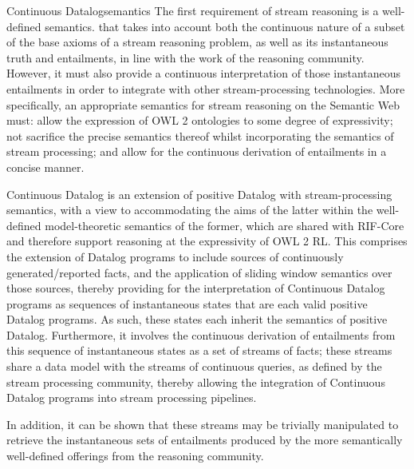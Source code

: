 \begin{nestedsection}{Continuous Datalog}{semantics}
The first requirement of stream reasoning is a well-defined semantics.
that takes into account both the continuous nature of a subset of the
base axioms of a stream reasoning problem, as well as its
instantaneous truth and entailments, in line with the work of the
reasoning community.  However, it must also provide a continuous
interpretation of those instantaneous entailments in order to
integrate with other stream-processing technologies.  More
specifically, an appropriate semantics for stream reasoning on the
Semantic Web must: allow the expression of OWL 2 ontologies to some
degree of expressivity; not sacrifice the precise semantics thereof
whilst incorporating the semantics of stream processing; and allow for
the continuous derivation of entailments in a concise manner.

Continuous Datalog is an extension of positive Datalog with
stream-processing semantics, with a view to accommodating the aims of
the latter within the well-defined model-theoretic semantics of the
former, which are shared with RIF-Core \cite{w3crifbld} and therefore
support reasoning at the expressivity of OWL 2 RL.  This comprises the
extension of Datalog programs to include sources of continuously
generated/reported facts, and the application of sliding window
semantics over those sources, thereby providing for the interpretation
of Continuous Datalog programs as sequences of instantaneous states
that are each valid positive Datalog programs.  As such, these states
each inherit the semantics of positive Datalog.  Furthermore, it
involves the continuous derivation of entailments from this sequence
of instantaneous states as a set of streams of facts; these streams
share a data model with the streams of continuous queries, as defined
by the stream processing community, thereby allowing the integration
of Continuous Datalog programs into stream processing pipelines.

In addition, it can be shown that these streams may be trivially
manipulated to retrieve the instantaneous sets of entailments produced
by the more semantically well-defined offerings from the reasoning
community.


\begin{definition}[Datalog]


\end{definition}
\end{nestedsection}
